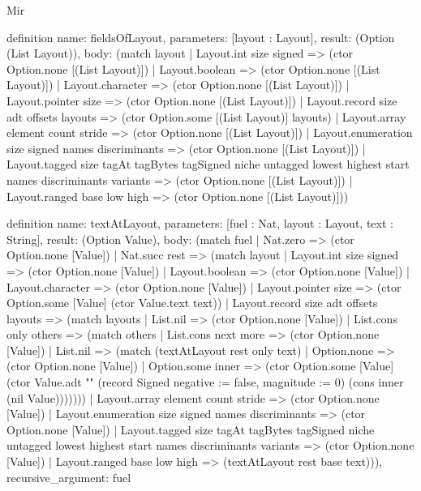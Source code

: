 \begin{lexlean}{Mir}
\begin{semanticmodule}
definition{
  name: fieldsOfLayout,
  parameters: [layout : Layout],
  result: (Option (List Layout)),
  body: (match layout
    | Layout.int size signed => (ctor Option.none [(List Layout)])
    | Layout.boolean => (ctor Option.none [(List Layout)])
    | Layout.character => (ctor Option.none [(List Layout)])
    | Layout.pointer size => (ctor Option.none [(List Layout)])
    | Layout.record size adt offsets layouts => (ctor Option.some [(List Layout)] layouts)
    | Layout.array element count stride => (ctor Option.none [(List Layout)])
    | Layout.enumeration size signed names discriminants => (ctor Option.none [(List Layout)])
    | Layout.tagged size tagAt tagBytes tagSigned niche untagged lowest highest start names discriminants variants => (ctor Option.none [(List Layout)])
    | Layout.ranged base low high => (ctor Option.none [(List Layout)]))
}

definition{
  name: textAtLayout,
  parameters: [fuel : Nat, layout : Layout, text : String],
  result: (Option Value),
  body: (match fuel
    | Nat.zero => (ctor Option.none [Value])
    | Nat.succ rest => (match layout
      | Layout.int size signed => (ctor Option.none [Value])
      | Layout.boolean => (ctor Option.none [Value])
      | Layout.character => (ctor Option.none [Value])
      | Layout.pointer size => (ctor Option.some [Value] (ctor Value.text text))
      | Layout.record size adt offsets layouts => (match layouts
        | List.nil => (ctor Option.none [Value])
        | List.cons only others => (match others
          | List.cons next more => (ctor Option.none [Value])
          | List.nil => (match (textAtLayout rest only text)
            | Option.none => (ctor Option.none [Value])
            | Option.some inner => (ctor Option.some [Value] (ctor Value.adt "" (record Signed {negative := false, magnitude := 0}) (cons inner (nil Value)))))))
      | Layout.array element count stride => (ctor Option.none [Value])
      | Layout.enumeration size signed names discriminants => (ctor Option.none [Value])
      | Layout.tagged size tagAt tagBytes tagSigned niche untagged lowest highest start names discriminants variants => (ctor Option.none [Value])
      | Layout.ranged base low high => (textAtLayout rest base text))),
  recursive_argument: fuel
}


\end{semanticmodule}
\end{lexlean}
